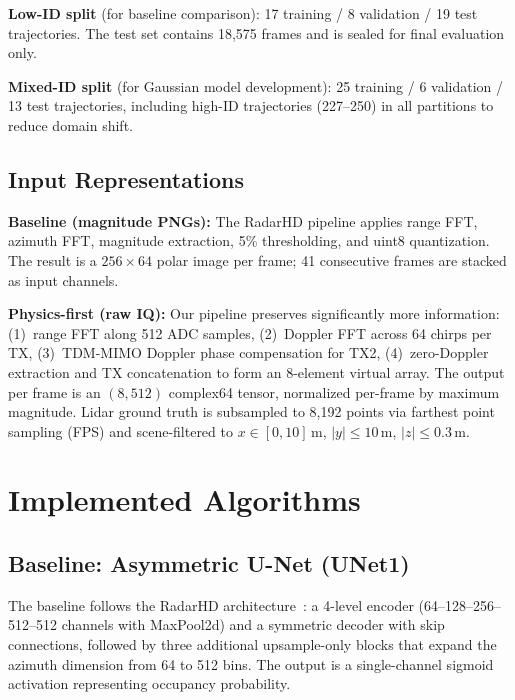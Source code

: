 \documentclass[conference]{IEEEtran}
\begin{document}
\textbf{Low-ID split} (for baseline comparison): 17 training / 8 validation / 19 test trajectories.
The test set contains 18,575 frames and is sealed for final evaluation only.

\textbf{Mixed-ID split} (for Gaussian model development): 25 training / 6 validation / 13 test trajectories, including high-ID trajectories (227--250) in all partitions to reduce domain shift.

\subsection{Input Representations}

\textbf{Baseline (magnitude PNGs):} The RadarHD pipeline applies range FFT, azimuth FFT, magnitude extraction, 5\% thresholding, and uint8 quantization.
The result is a $256 \times 64$ polar image per frame; 41 consecutive frames are stacked as input channels.

\textbf{Physics-first (raw IQ):}
Our pipeline preserves significantly more information:
(1)~range FFT along 512 ADC samples,
(2)~Doppler FFT across 64 chirps per TX,
(3)~TDM-MIMO Doppler phase compensation for TX2,
(4)~zero-Doppler extraction and TX concatenation to form an 8-element virtual array.
The output per frame is an $(8, 512)$ complex64 tensor, normalized per-frame by maximum magnitude.
Lidar ground truth is subsampled to 8,192 points via farthest point sampling (FPS) and scene-filtered to $x \in [0, 10]$\,m, $|y| \leq 10$\,m, $|z| \leq 0.3$\,m.

\section{Implemented Algorithms}

\subsection{Baseline: Asymmetric U-Net (UNet1)}

The baseline follows the RadarHD architecture~\cite{prabhakara2023radarhd, ronneberger2015unet}: a 4-level encoder (64--128--256--512--512 channels with MaxPool2d) and a symmetric decoder with skip connections, followed by three additional upsample-only blocks that expand the azimuth dimension from 64 to 512 bins.
The output is a single-channel sigmoid activation representing occupancy probability.
\end{document}
